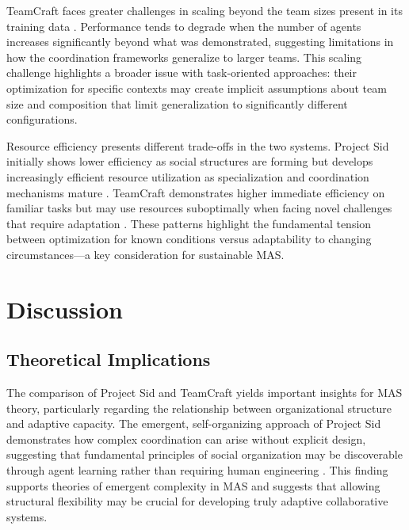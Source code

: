 \documentclass[a4paper, 12pt]{article}
\begin{document}
TeamCraft faces greater challenges in scaling beyond the team sizes present in its training data \autocite{long2024teamcraftbenchmarkmultimodalmultiagent,yu2024minelandsimulatinglargescalemultiagent}. Performance tends to degrade when the number of agents increases significantly beyond what was demonstrated, suggesting limitations in how the coordination frameworks generalize to larger teams. This scaling challenge highlights a broader issue with task-oriented approaches: their optimization for specific contexts may create implicit assumptions about team size and composition that limit generalization to significantly different configurations.

Resource efficiency presents different trade-offs in the two systems. Project Sid initially shows lower efficiency as social structures are forming but develops increasingly efficient resource utilization as specialization and coordination mechanisms mature \autocite{al2024projectsidmanyagentsimulations}. TeamCraft demonstrates higher immediate efficiency on familiar tasks but may use resources suboptimally when facing novel challenges that require adaptation \autocite{long2024teamcraftbenchmarkmultimodalmultiagent}. These patterns highlight the fundamental tension between optimization for known conditions versus adaptability to changing circumstances---a key consideration for sustainable MAS.

\section{Discussion}

\subsection{Theoretical Implications}

The comparison of Project Sid and TeamCraft yields important insights for MAS theory, particularly regarding the relationship between organizational structure and adaptive capacity. The emergent, self-organizing approach of Project Sid demonstrates how complex coordination can arise without explicit design, suggesting that fundamental principles of social organization may be discoverable through agent learning rather than requiring human engineering \autocite{al2024projectsidmanyagentsimulations,chen2024sagentsselforganizingagentsopenended}. This finding supports theories of emergent complexity in MAS and suggests that allowing structural flexibility may be crucial for developing truly adaptive collaborative systems.
\end{document}
